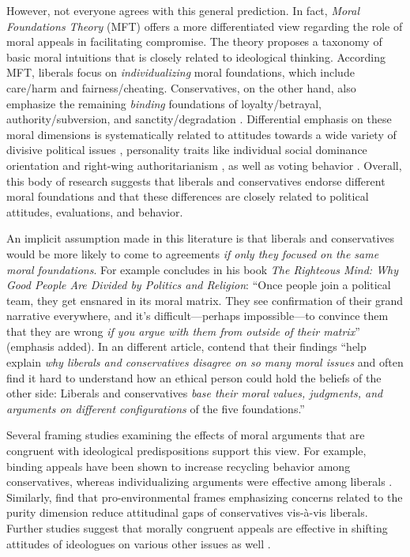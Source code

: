 However, not everyone agrees with this general prediction. In fact, \textit{Moral Foundations Theory} (MFT) offers a more differentiated view regarding the role of moral appeals in facilitating compromise. The theory proposes a taxonomy of basic moral intuitions that is closely related to ideological thinking. According MFT, liberals focus on \emph{individualizing} moral foundations, which include care/harm and fairness/cheating. Conservatives, on the other hand, also emphasize the remaining \emph{binding} foundations of loyalty/betrayal, authority/subversion, and sanctity/degradation \citep{haidt2007morality, graham2009liberals}. Differential emphasis on these moral dimensions is systematically related to attitudes towards a wide variety of divisive political issues \citep[e.g.][]{koleva2012tracing, kertzer2014moral, low2015moral}, personality traits like individual social dominance orientation and right-wing authoritarianism \citep{federico2013mapping}, as well as voting behavior \citep{franks2015using}. Overall, this body of research suggests that liberals and conservatives endorse different moral foundations and that these differences are closely related to political attitudes, evaluations, and behavior.

An implicit assumption made in this literature is that liberals and conservatives would be more likely to come to agreements \emph{if only they focused on the same moral foundations}. For example \citet[365]{haidt2012righteous} concludes in his book \emph{The Righteous Mind: Why Good People Are Divided by Politics and Religion}: ``Once people join a political team, they get ensnared in its moral matrix. They see confirmation of their grand
narrative everywhere, and it's difficult---perhaps impossible---to convince them that they are wrong \emph{if you argue with them from outside of their matrix}'' (emphasis added). In an different article, \citet[1040]{graham2009liberals} contend that their findings ``help explain \emph{why liberals and conservatives disagree on so many moral issues} and often find it hard to understand how an ethical person could hold the beliefs of the other side: Liberals and conservatives \emph{base their moral values, judgments, and arguments on different configurations} of the five foundations.''

Several framing studies examining the effects of moral arguments that are congruent with ideological predispositions support this view. For example, binding appeals have been shown to increase recycling behavior among conservatives, whereas individualizing arguments were effective among liberals \citep{kidwell2013getting}. Similarly, \citet{feinberg2013moral} find that pro-environmental frames emphasizing concerns related to the purity dimension reduce attitudinal gaps of conservatives vis-\`a-vis liberals. Further studies suggest that morally congruent appeals are effective in shifting attitudes of ideologues on various other issues as well \citep[e.g.,][]{day2014shifting,feinberg2015gulf}.

